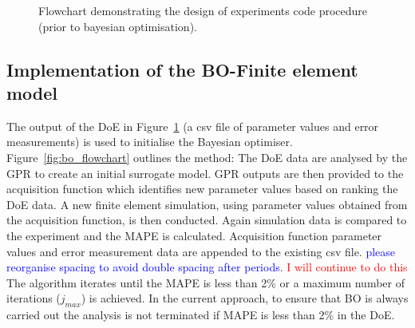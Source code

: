 \documentclass[preprint, review, 12pt]{elsarticle}
\begin{document}
{\begin{figure}[!htbp]
		\caption{Flowchart demonstrating the design of experiments code procedure (prior to bayesian optimisation).}
		\label{fig:doe_flowchart}
	\end{figure}

	\subsection{Implementation of the BO-Finite element model}
	\label{h:bayesian_opt}
	The output of the DoE in Figure~\ref{fig:doe_flowchart} (a csv file of parameter values and error measurements) is used to initialise the Bayesian optimiser.
	Figure~\ref{fig:bo_flowchart} outlines the method: The DoE data are analysed by the GPR to create an initial surrogate model.
	GPR outputs are then provided to the acquisition function which identifies new parameter values based on ranking the DoE data.
	A new finite element simulation, using parameter values obtained from the acquisition function, is then conducted.
	Again simulation data is compared to the experiment and the MAPE is calculated.
	Acquisition function parameter values and error measurement data are appended to the existing csv file.
	\textcolor{blue}{please reorganise spacing to avoid double spacing after periods}.
	\textcolor{red}{I will continue to do this}
	The algorithm iterates until the MAPE is less than 2\% or a maximum number of iterations ($j_{max}$) is achieved.
	In the current approach, to ensure that BO is always carried out the analysis is not terminated if MAPE is less than 2\% in the DoE.

}
\end{document}
